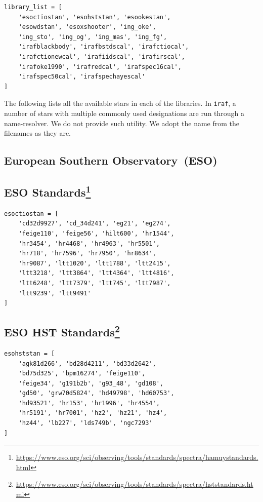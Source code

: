 \documentclass[fleqn,usenatbib]{mnras}
\begin{document}
\begin{verbatim}
library_list = [
    'esoctiostan', 'esohststan', 'esookestan',
    'esowdstan', 'esoxshooter', 'ing_oke',
    'ing_sto', 'ing_og', 'ing_mas', 'ing_fg',
    'irafblackbody', 'irafbstdscal', 'irafctiocal',
    'irafctionewcal', 'irafiidscal', 'irafirscal',
    'irafoke1990', 'irafredcal', 'irafspec16cal',
    'irafspec50cal', 'irafspechayescal'
]
\end{verbatim}

The following lists all the available stars in each of the libraries.
In \texttt{iraf}, a number of stars with multiple commonly used designations
are run through a name-resolver. We do not provide such utility.
We adopt the name from the filenames as they are.

\subsection{European Southern Observatory~(ESO)}

\subsection*{ESO \citet{1992PASP..104..533H, 1994PASP..106..566H} Standards\footnote{\url{https://www.eso.org/sci/observing/tools/standards/spectra/hamuystandards.html}}}
\begin{verbatim}
esoctiostan = [
    'cd32d9927', 'cd_34d241', 'eg21', 'eg274',
    'feige110', 'feige56', 'hilt600', 'hr1544',
    'hr3454', 'hr4468', 'hr4963', 'hr5501',
    'hr718', 'hr7596', 'hr7950', 'hr8634',
    'hr9087', 'ltt1020', 'ltt1788', 'ltt2415',
    'ltt3218', 'ltt3864', 'ltt4364', 'ltt4816',
    'ltt6248', 'ltt7379', 'ltt745', 'ltt7987',
    'ltt9239', 'ltt9491'
]
\end{verbatim}

\subsection*{ESO \citet{1995AJ....110.1316B, 1996AJ....111.1743B} HST Standards\footnote{\url{https://www.eso.org/sci/observing/tools/standards/spectra/hststandards.html}}}
\begin{verbatim}
esohststan = [
    'agk81d266', 'bd28d4211', 'bd33d2642',
    'bd75d325', 'bpm16274', 'feige110',
    'feige34', 'g191b2b', 'g93_48', 'gd108',
    'gd50', 'grw70d5824', 'hd49798', 'hd60753',
    'hd93521', 'hr153', 'hr1996', 'hr4554',
    'hr5191', 'hr7001', 'hz2', 'hz21', 'hz4',
    'hz44', 'lb227', 'lds749b', 'ngc7293'
]
\end{verbatim}
\end{document}
